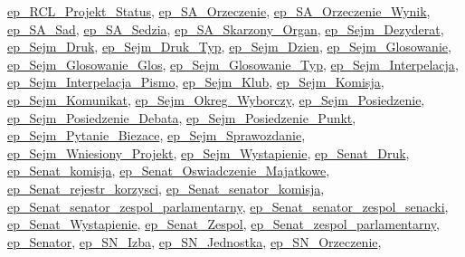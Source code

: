 \hyperlink{classep___r_c_l___projekt___status}{ep\-\_\-\-R\-C\-L\-\_\-\-Projekt\-\_\-\-Status}, \hyperlink{classep___s_a___orzeczenie}{ep\-\_\-\-S\-A\-\_\-\-Orzeczenie}, \hyperlink{classep___s_a___orzeczenie___wynik}{ep\-\_\-\-S\-A\-\_\-\-Orzeczenie\-\_\-\-Wynik}, \hyperlink{classep___s_a___sad}{ep\-\_\-\-S\-A\-\_\-\-Sad}, \hyperlink{classep___s_a___sedzia}{ep\-\_\-\-S\-A\-\_\-\-Sedzia}, \hyperlink{classep___s_a___skarzony___organ}{ep\-\_\-\-S\-A\-\_\-\-Skarzony\-\_\-\-Organ}, \hyperlink{classep___sejm___dezyderat}{ep\-\_\-\-Sejm\-\_\-\-Dezyderat}, \hyperlink{classep___sejm___druk}{ep\-\_\-\-Sejm\-\_\-\-Druk}, \hyperlink{classep___sejm___druk___typ}{ep\-\_\-\-Sejm\-\_\-\-Druk\-\_\-\-Typ}, \hyperlink{classep___sejm___dzien}{ep\-\_\-\-Sejm\-\_\-\-Dzien}, \hyperlink{classep___sejm___glosowanie}{ep\-\_\-\-Sejm\-\_\-\-Glosowanie}, \hyperlink{classep___sejm___glosowanie___glos}{ep\-\_\-\-Sejm\-\_\-\-Glosowanie\-\_\-\-Glos}, \hyperlink{classep___sejm___glosowanie___typ}{ep\-\_\-\-Sejm\-\_\-\-Glosowanie\-\_\-\-Typ}, \hyperlink{classep___sejm___interpelacja}{ep\-\_\-\-Sejm\-\_\-\-Interpelacja}, \hyperlink{classep___sejm___interpelacja___pismo}{ep\-\_\-\-Sejm\-\_\-\-Interpelacja\-\_\-\-Pismo}, \hyperlink{classep___sejm___klub}{ep\-\_\-\-Sejm\-\_\-\-Klub}, \hyperlink{classep___sejm___komisja}{ep\-\_\-\-Sejm\-\_\-\-Komisja}, \hyperlink{classep___sejm___komunikat}{ep\-\_\-\-Sejm\-\_\-\-Komunikat}, \hyperlink{classep___sejm___okreg___wyborczy}{ep\-\_\-\-Sejm\-\_\-\-Okreg\-\_\-\-Wyborczy}, \hyperlink{classep___sejm___posiedzenie}{ep\-\_\-\-Sejm\-\_\-\-Posiedzenie}, \hyperlink{classep___sejm___posiedzenie___debata}{ep\-\_\-\-Sejm\-\_\-\-Posiedzenie\-\_\-\-Debata}, \hyperlink{classep___sejm___posiedzenie___punkt}{ep\-\_\-\-Sejm\-\_\-\-Posiedzenie\-\_\-\-Punkt}, \hyperlink{classep___sejm___pytanie___biezace}{ep\-\_\-\-Sejm\-\_\-\-Pytanie\-\_\-\-Biezace}, \hyperlink{classep___sejm___sprawozdanie}{ep\-\_\-\-Sejm\-\_\-\-Sprawozdanie}, \hyperlink{classep___sejm___wniesiony___projekt}{ep\-\_\-\-Sejm\-\_\-\-Wniesiony\-\_\-\-Projekt}, \hyperlink{classep___sejm___wystapienie}{ep\-\_\-\-Sejm\-\_\-\-Wystapienie}, \hyperlink{classep___senat___druk}{ep\-\_\-\-Senat\-\_\-\-Druk}, \hyperlink{classep___senat__komisja}{ep\-\_\-\-Senat\-\_\-komisja}, \hyperlink{classep___senat___oswiadczenie___majatkowe}{ep\-\_\-\-Senat\-\_\-\-Oswiadczenie\-\_\-\-Majatkowe}, \hyperlink{classep___senat__rejestr__korzysci}{ep\-\_\-\-Senat\-\_\-rejestr\-\_\-korzysci}, \hyperlink{classep___senat__senator__komisja}{ep\-\_\-\-Senat\-\_\-senator\-\_\-komisja}, \hyperlink{classep___senat__senator__zespol__parlamentarny}{ep\-\_\-\-Senat\-\_\-senator\-\_\-zespol\-\_\-parlamentarny}, \hyperlink{classep___senat__senator__zespol__senacki}{ep\-\_\-\-Senat\-\_\-senator\-\_\-zespol\-\_\-senacki}, \hyperlink{classep___senat___wystapienie}{ep\-\_\-\-Senat\-\_\-\-Wystapienie}, \hyperlink{classep___senat___zespol}{ep\-\_\-\-Senat\-\_\-\-Zespol}, \hyperlink{classep___senat__zespol__parlamentarny}{ep\-\_\-\-Senat\-\_\-zespol\-\_\-parlamentarny}, \hyperlink{classep___senator}{ep\-\_\-\-Senator}, \hyperlink{classep___s_n___izba}{ep\-\_\-\-S\-N\-\_\-\-Izba}, \hyperlink{classep___s_n___jednostka}{ep\-\_\-\-S\-N\-\_\-\-Jednostka}, \hyperlink{classep___s_n___orzeczenie}{ep\-\_\-\-S\-N\-\_\-\-Orzeczenie}, 